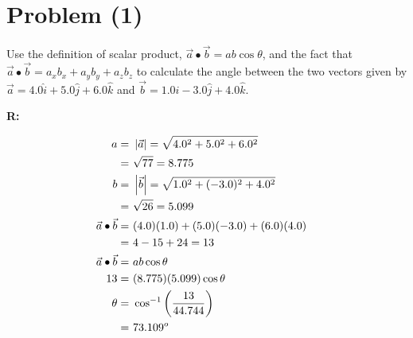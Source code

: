 \section{Problem (1)}
	Use the definition of scalar product, $\vec{a} \bullet \vec{b} = ab \cos \theta$, and the fact that $\vec{a} \bullet \vec{b} = a_{x}b_{x} + a_{y}b_{y} + a_{z}b_{z}$ to calculate the angle between the two vectors given by $\vec{a} = 4.0 \hat{i} + 5.0 \hat{j} + 6.0 \hat{k}$ and $\vec{b} = 1.0 \hat{i} - 3.0 \hat{j} + 4.0 \hat{k}$.

	\textbf{R:}

	\begin{align}
		a = \ &\left| \vec{a} \right| = \sqrt{4.0^{2} + 5.0^{2} + 6.0^{2}}& \notag \\
		= \ &\sqrt{77} = 8.775& \notag \\
		b = \ &\left| \vec{b} \right| = \sqrt{1.0^{2} + (-3.0)^{2} + 4.0^{2}}& \notag \\
		= \ &\sqrt{26} = 5.099& \notag \\
		\vec{a} \bullet \vec{b} = \ &(4.0)(1.0) + (5.0)(-3.0) + (6.0)(4.0)& \notag \\
		= \ &4 - 15 + 24 = 13& \notag \\
		\vec{a} \bullet \vec{b} = \ &ab \cos \theta& \notag \\
		13 = \ &(8.775)(5.099) \cos \theta& \notag \\
		\theta = \ & \cos^{-1} \left( \frac{13}{44.744} \right) & \notag \\
		= \ &73.109^{o}&
	\end{align}
